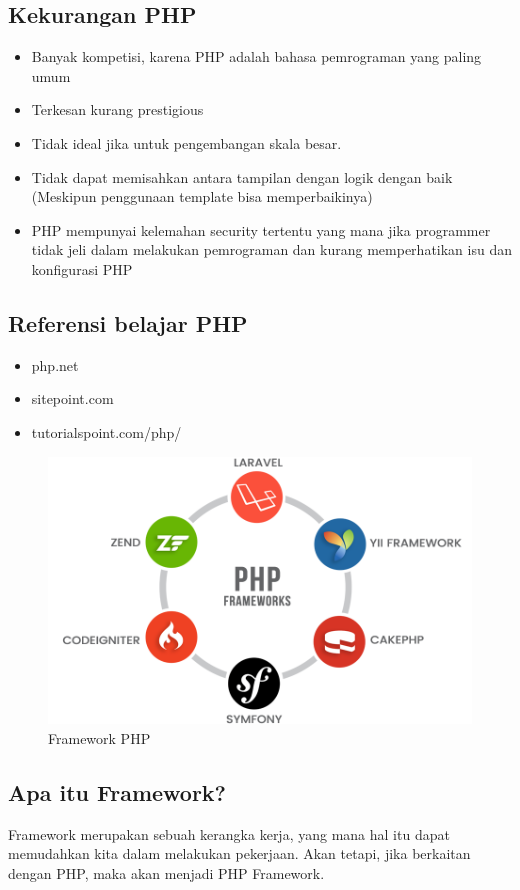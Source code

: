\begin{enumerate}
\subsection{Kekurangan PHP}
\begin{itemize}
	\item Banyak kompetisi, karena PHP adalah bahasa pemrograman yang paling umum
	\item Terkesan kurang prestigious
	\item Tidak ideal jika untuk pengembangan skala besar.
	\item Tidak dapat memisahkan antara tampilan dengan logik dengan baik (Meskipun penggunaan template bisa memperbaikinya)
	\item PHP mempunyai kelemahan security tertentu yang mana jika programmer tidak jeli dalam melakukan pemrograman dan kurang memperhatikan isu dan konfigurasi PHP
\end{itemize}

\subsection{Referensi belajar PHP}
\begin{itemize}
	\item php.net
	\item sitepoint.com
	\item tutorialspoint.com/php/
\end{itemize}

	\begin{figure}[H]
		\includegraphics[width=12cm]{figures/web/phpframework.png}
		\centering
		\caption{Framework PHP}
	\end{figure}
\subsection{Apa itu Framework?}
Framework merupakan sebuah kerangka kerja, yang mana hal itu dapat memudahkan kita dalam melakukan pekerjaan. Akan tetapi, jika berkaitan dengan PHP, maka akan menjadi PHP Framework.


\end{enumerate}
